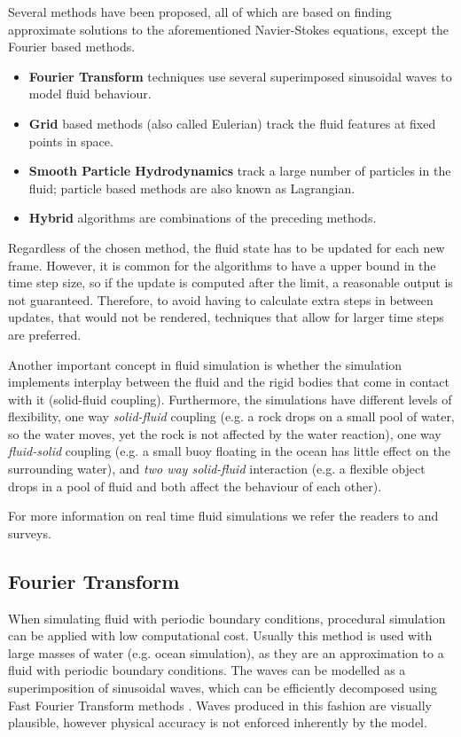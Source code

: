 Several methods have been proposed, all of which are based on finding approximate solutions to the aforementioned Navier-Stokes equations, except the Fourier based methods.

\begin{itemize}
\item \textbf{Fourier Transform} techniques use several superimposed sinusoidal waves to model fluid behaviour.
\item \textbf{Grid} based methods (also called Eulerian) track the fluid features at fixed points in space.
\item \textbf{Smooth Particle Hydrodynamics} track a large number of particles in the fluid; particle based methods are also known as Lagrangian.
\item \textbf{Hybrid} algorithms are combinations of the preceding methods.
\end{itemize}

Regardless of the chosen method, the fluid state has to be updated for each new frame.
However, it is common for the algorithms to have a upper bound in the time step size, so if the update is computed after the limit, a reasonable output is not guaranteed.
Therefore, to avoid having to calculate extra steps in between updates, that would not be rendered, techniques that allow for larger time steps are preferred.  

Another important concept in fluid simulation is whether the simulation implements interplay between the fluid and the rigid bodies that come in contact with it (solid-fluid coupling).
Furthermore, the simulations have different levels of flexibility, one way \emph{solid-fluid} coupling (e.g. a rock drops on a small pool of water, so the water moves, yet the rock is not affected by the water reaction), one way \emph{fluid-solid} coupling (e.g. a small buoy floating in the ocean has little effect on the surrounding water), and \emph{two way solid-fluid} interaction (e.g. a flexible object drops in a pool of fluid and both affect the behaviour of each other).

For more information on real time fluid simulations we refer the readers to \cite{Vines2012} and \cite{Ihmsen2014} surveys.

\subsection{Fourier Transform}

When simulating fluid with periodic boundary conditions, procedural simulation can be applied with low computational cost.
Usually this method is used with large masses of water (e.g. ocean simulation), as they are an approximation to a fluid with periodic boundary conditions.
The waves can be modelled as a superimposition of sinusoidal waves, which can be efficiently decomposed using Fast Fourier Transform methods \cite{Mastin1987}.
Waves produced in this fashion are visually plausible, however physical accuracy is not enforced inherently by the model.

